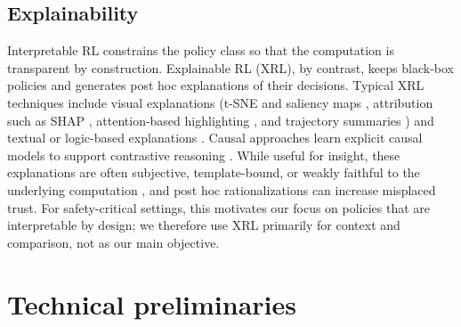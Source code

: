 \subsection{Explainability}
Interpretable RL constrains the policy class so that the computation is transparent by construction. Explainable RL (XRL), by contrast, keeps black-box policies and generates post hoc explanations of their decisions. Typical XRL techniques include visual explanations (t-SNE and saliency maps \cite{zahavy_graying_2016,maaten_visualizing_2008,greydanus_visualizing_2018,gupta_explain_2020}, attribution such as SHAP \cite{lundberg_unified_2017,wang_attribution-based_2020}, attention-based highlighting \cite{shi_self-supervised_2020,kim_attentional_2020}, and trajectory summaries \cite{sequeira_interestingness_2020}) and textual or logic-based explanations \cite{hayes_improving_2017,van_der_waa_contrastive_2018,fukuchi_autonomous_2017}. Causal approaches learn explicit causal models to support contrastive reasoning \cite{madumal_explainable_2020,madumal_distal_2020}.
While useful for insight, these explanations are often subjective, template-bound, or weakly faithful to the underlying computation \cite{atrey2019exploratory}, and post hoc rationalizations can increase misplaced trust. For safety-critical settings, this motivates our focus on policies that are interpretable by design; we therefore use XRL primarily for context and comparison, not as our main objective.


\section{Technical preliminaries}

